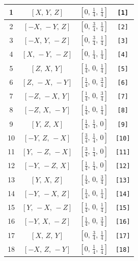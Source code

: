 \documentclass[fleqn,8pt]{jsarticle}
\begin{document}
\begin{longtable}{cccc}
1 & $\left[ X,\, Y,\, Z \right]$ & $\left[ 0,\, \frac{1}{4},\, \frac{1}{4} \right]$ & {\tt [1]} \\ \hline
2 & $\left[ - X,\, - Y,\, Z \right]$ & $\left[ 0,\, \frac{3}{4},\, \frac{1}{4} \right]$ & {\tt [2]} \\ \hline
3 & $\left[ - X,\, Y,\, - Z \right]$ & $\left[ 0,\, \frac{3}{4},\, \frac{1}{4} \right]$ & {\tt [3]} \\ \hline
4 & $\left[ X,\, - Y,\, - Z \right]$ & $\left[ 0,\, \frac{1}{4},\, \frac{1}{4} \right]$ & {\tt [4]} \\ \hline
5 & $\left[ Z,\, X,\, Y \right]$ & $\left[ \frac{1}{4},\, 0,\, \frac{1}{4} \right]$ & {\tt [5]} \\ \hline
6 & $\left[ Z,\, - X,\, - Y \right]$ & $\left[ \frac{1}{4},\, 0,\, \frac{3}{4} \right]$ & {\tt [6]} \\ \hline
7 & $\left[ - Z,\, - X,\, Y \right]$ & $\left[ \frac{1}{4},\, 0,\, \frac{3}{4} \right]$ & {\tt [7]} \\ \hline
8 & $\left[ - Z,\, X,\, - Y \right]$ & $\left[ \frac{1}{4},\, 0,\, \frac{1}{4} \right]$ & {\tt [8]} \\ \hline
9 & $\left[ Y,\, Z,\, X \right]$ & $\left[ \frac{1}{4},\, \frac{1}{4},\, 0 \right]$ & {\tt [9]} \\ \hline
10 & $\left[ - Y,\, Z,\, - X \right]$ & $\left[ \frac{3}{4},\, \frac{1}{4},\, 0 \right]$ & {\tt [10]} \\ \hline
11 & $\left[ Y,\, - Z,\, - X \right]$ & $\left[ \frac{3}{4},\, \frac{1}{4},\, 0 \right]$ & {\tt [11]} \\ \hline
12 & $\left[ - Y,\, - Z,\, X \right]$ & $\left[ \frac{1}{4},\, \frac{1}{4},\, 0 \right]$ & {\tt [12]} \\ \hline
13 & $\left[ Y,\, X,\, Z \right]$ & $\left[ \frac{1}{4},\, 0,\, \frac{3}{4} \right]$ & {\tt [13]} \\ \hline
14 & $\left[ - Y,\, - X,\, Z \right]$ & $\left[ \frac{1}{4},\, 0,\, \frac{1}{4} \right]$ & {\tt [14]} \\ \hline
15 & $\left[ Y,\, - X,\, - Z \right]$ & $\left[ \frac{1}{4},\, 0,\, \frac{1}{4} \right]$ & {\tt [15]} \\ \hline
16 & $\left[ - Y,\, X,\, - Z \right]$ & $\left[ \frac{1}{4},\, 0,\, \frac{3}{4} \right]$ & {\tt [16]} \\ \hline
17 & $\left[ X,\, Z,\, Y \right]$ & $\left[ 0,\, \frac{3}{4},\, \frac{1}{4} \right]$ & {\tt [17]} \\ \hline
18 & $\left[ - X,\, Z,\, - Y \right]$ & $\left[ 0,\, \frac{1}{4},\, \frac{1}{4} \right]$ & {\tt [18]} \\ \hline

\end{longtable}
\end{document}
